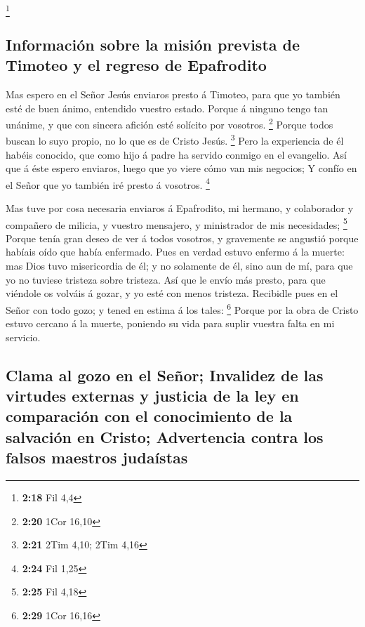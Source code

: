 \footnote{\textbf{2:18} Fil 4,4}

\hypertarget{informaciuxf3n-sobre-la-misiuxf3n-prevista-de-timoteo-y-el-regreso-de-epafrodito}{%
\subsection{Información sobre la misión prevista de Timoteo y el regreso
de
Epafrodito}\label{informaciuxf3n-sobre-la-misiuxf3n-prevista-de-timoteo-y-el-regreso-de-epafrodito}}

 Mas espero en el Señor Jesús enviaros presto á Timoteo,
para que yo también esté de buen ánimo, entendido vuestro estado.
 Porque á ninguno tengo tan unánime, y que con sincera
afición esté solícito por vosotros. \footnote{\textbf{2:20} 1Cor 16,10}
 Porque todos buscan lo suyo propio, no lo que es de
Cristo Jesús. \footnote{\textbf{2:21} 2Tim 4,10; 2Tim 4,16}
 Pero la experiencia de él habéis conocido, que como hijo
á padre ha servido conmigo en el evangelio.  Así que á
éste espero enviaros, luego que yo viere cómo van mis negocios;
 Y confío en el Señor que yo también iré presto á
vosotros. \footnote{\textbf{2:24} Fil 1,25}

 Mas tuve por cosa necesaria enviaros á Epafrodito, mi
hermano, y colaborador y compañero de milicia, y vuestro mensajero, y
ministrador de mis necesidades; \footnote{\textbf{2:25} Fil 4,18}
 Porque tenía gran deseo de ver á todos vosotros, y
gravemente se angustió porque habíais oído que había enfermado.
 Pues en verdad estuvo enfermo á la muerte: mas Dios tuvo
misericordia de él; y no solamente de él, sino aun de mí, para que yo no
tuviese tristeza sobre tristeza.  Así que le envío más
presto, para que viéndole os volváis á gozar, y yo esté con menos
tristeza.  Recibidle pues en el Señor con todo gozo; y
tened en estima á los tales: \footnote{\textbf{2:29} 1Cor 16,16}
 Porque por la obra de Cristo estuvo cercano á la muerte,
poniendo su vida para suplir vuestra falta en mi servicio.

\hypertarget{clama-al-gozo-en-el-seuxf1or-invalidez-de-las-virtudes-externas-y-justicia-de-la-ley-en-comparaciuxf3n-con-el-conocimiento-de-la-salvaciuxf3n-en-cristo-advertencia-contra-los-falsos-maestros-judauxedstas}{%
\subsection{Clama al gozo en el Señor; Invalidez de las virtudes
externas y justicia de la ley en comparación con el conocimiento de la
salvación en Cristo; Advertencia contra los falsos maestros
judaístas}\label{clama-al-gozo-en-el-seuxf1or-invalidez-de-las-virtudes-externas-y-justicia-de-la-ley-en-comparaciuxf3n-con-el-conocimiento-de-la-salvaciuxf3n-en-cristo-advertencia-contra-los-falsos-maestros-judauxedstas}}

